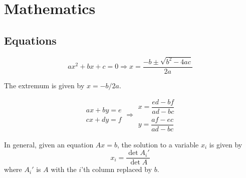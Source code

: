 
\chapter{Mathematics}

\section{Equations}
\[ax^2+bx+c=0 \Rightarrow x = \frac{-b\pm\sqrt{b^2-4ac}}{2a}\]

The extremum is given by $x = -b/2a$.

\[\begin{aligned}ax+by=e\\cx+dy=f\end{aligned}
\Rightarrow
\begin{aligned}x=\dfrac{ed-bf}{ad-bc}\\y=\dfrac{af-ec}{ad-bc}\end{aligned}\]

In general, given an equation $Ax = b$, the solution to a variable $x_i$ is given by
\[x_i = \frac{\det A_i'}{\det A} \]
where $A_i'$ is $A$ with the $i$'th column replaced by $b$.


